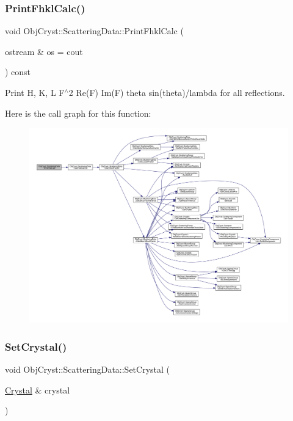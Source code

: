 \subsubsection{\texorpdfstring{PrintFhklCalc()}{PrintFhklCalc()}}
{\footnotesize\ttfamily void Obj\+Cryst\+::\+Scattering\+Data\+::\+Print\+Fhkl\+Calc (\begin{DoxyParamCaption}\item[{ostream \&}]{os = {\ttfamily cout} }\end{DoxyParamCaption}) const\hspace{0.3cm}{\ttfamily [virtual]}}



Print H, K, L F$^\wedge$2 Re(\+F) Im(\+F) theta sin(theta)/lambda for all reflections. 

Here is the call graph for this function\+:
\nopagebreak
\begin{figure}[H]
\begin{center}
\leavevmode
\includegraphics[width=350pt]{class_obj_cryst_1_1_scattering_data_a19b6958c0420a7e8dca0664c19f5f2f4_cgraph}
\end{center}
\end{figure}
\mbox{\label{class_obj_cryst_1_1_scattering_data_a590a553dbea1970266a864256ebf94f3}} 
\subsubsection{\texorpdfstring{SetCrystal()}{SetCrystal()}}
{\footnotesize\ttfamily void Obj\+Cryst\+::\+Scattering\+Data\+::\+Set\+Crystal (\begin{DoxyParamCaption}\item[{\mbox{\hyperlink{class_obj_cryst_1_1_crystal}{Crystal}} \&}]{crystal }\end{DoxyParamCaption})\hspace{0.3cm}{\ttfamily [virtual]}}

